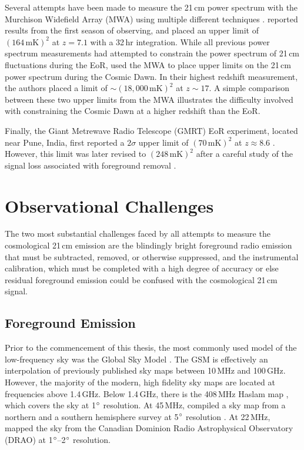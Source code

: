 \begin{bibunit}
Several attempts have been made to measure the 21\,cm power spectrum with the Murchison Widefield
Array (MWA) using multiple different techniques \citep{2016ApJ...825..114J}.
\citet{2016ApJ...833..102B} reported results from the first season of observing, and placed an upper
limit of $(164\,\text{mK})^2$ at $z=7.1$ with a 32\,hr integration.  While all previous power
spectrum measurements had attempted to constrain the power spectrum of 21\,cm fluctuations during
the EoR, \citet{2016MNRAS.460.4320E} used the MWA to place upper limits on the 21\,cm power spectrum
during the Cosmic Dawn.  In their highest redshift measurement, the authors placed a limit of $\sim
(18,000\,\text{mK})^2$ at $z\sim 17$. A simple comparison between these two upper limits from the
MWA illustrates the difficulty involved with constraining the Cosmic Dawn at a higher redshift than
the EoR.

Finally, the Giant Metrewave Radio Telescope (GMRT) EoR experiment, located near Pune, India, first
reported a $2\sigma$ upper limit of $(70\,\text{mK})^2$ at $z \approx 8.6$
\citep{2011MNRAS.413.1174P}.  However, this limit was later revised to $(248\,\text{mK})^2$ after a
careful study of the signal loss associated with foreground removal \citep{2013MNRAS.433..639P}.

\section{Observational Challenges}

The two most substantial challenges faced by all attempts to measure the cosmological 21\,cm
emission are the blindingly bright foreground radio emission that must be subtracted, removed, or
otherwise suppressed, and the instrumental calibration, which must be completed with a high degree
of accuracy or else residual foreground emission could be confused with the cosmological 21\,cm
signal.

\subsection{Foreground Emission}

Prior to the commencement of this thesis, the most commonly used model of the low-frequency sky was
the Global Sky Model \citep[GSM;][]{2008MNRAS.388..247D}. The GSM is effectively an interpolation of
previously published sky maps between 10\,MHz and 100\,GHz. However, the majority of the modern,
high fidelity sky maps are located at frequencies above 1.4\,GHz. Below 1.4\,GHz, there is the
408\,MHz Haslam map \citep{1981A&A...100..209H,1982A&AS...47....1H}, which covers the sky at
1$\mbox{$^\circ$}$ resolution. At 45\,MHz, \citet{2011A&A...525A.138G} compiled a sky map from a northern
and a southern hemisphere survey at 5$\mbox{$^\circ$}$ resolution \citep{1997A&AS..124..315A,
1999A&AS..140..145M}. At 22\,MHz, \citet{1999A&AS..137....7R} mapped the sky from the Canadian
Dominion Radio Astrophysical Observatory (DRAO) at 1$\mbox{$^\circ$}$--2$\mbox{$^\circ$}$ resolution.


\end{bibunit}
